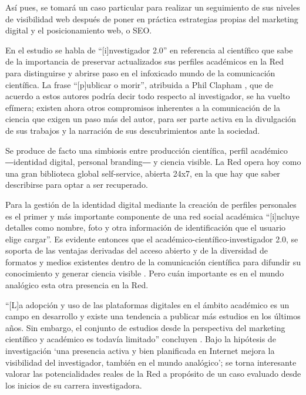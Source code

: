 \documentclass{textolivre}
\begin{document}
Así pues, se tomará un caso particular para realizar un seguimiento de sus niveles de visibilidad web después de poner en práctica estrategias propias del marketing digital y el posicionamiento web, o SEO.

En el estudio se habla de “[i]nvestigador 2.0” \cite{mandia-rubal_implantacion_2019} en referencia al científico que sabe de la importancia de preservar actualizados sus perfiles académicos en la Red para distinguirse y abrirse paso en el infoxicado mundo de la comunicación científica. La frase “[p]ublicar o morir”, atribuida a Phil Clapham , que de acuerdo a estos autores podría decir todo respecto al investigador, se ha vuelto efímera; existen ahora otros compromisos inherentes a la comunicación de la ciencia que exigen un paso más del autor, para ser parte activa en la divulgación de sus trabajos y la narración de sus descubrimientos ante la sociedad. 

Se produce de facto una simbiosis entre producción científica, perfil académico ―identidad digital, personal branding― y ciencia visible. La Red opera hoy como una gran biblioteca global self-service, abierta 24x7, en la que hay que saber describirse para optar a ser recuperado.

Para \textcite[p. 3]{meishar-tal_why_2017} la gestión de la identidad digital mediante la creación de perfiles personales es el primer y más importante componente de una red social académica “[i]ncluye detalles como nombre, foto y otra información de identificación que el usuario elige cargar”. Es evidente entonces que el académico-científico-investigador 2.0, se soporta de las ventajas derivadas del acceso abierto y de la diversidad de formatos y medios existentes dentro de la comunicación científica para difundir su conocimiento y generar ciencia visible \cite{russell_highly_2007}. Pero cuán importante es en el mundo analógico esta otra presencia en la Red.

“[L]a adopción y uso de las plataformas digitales en el ámbito académico es un campo en desarrollo y existe una tendencia a publicar más estudios en los últimos años. Sin embargo, el conjunto de estudios desde la perspectiva del marketing científico y académico es todavía limitado” concluyen \textcite[p. 75]{siso_calvo_plataformas_2020}. Bajo la hipótesis de investigación ‘una presencia activa y bien planificada en Internet mejora la visibilidad del investigador, también en el mundo analógico’; se torna interesante valorar las potencialidades reales de la Red a propósito de un caso evaluado desde los inicios de su carrera investigadora.
\end{document}
